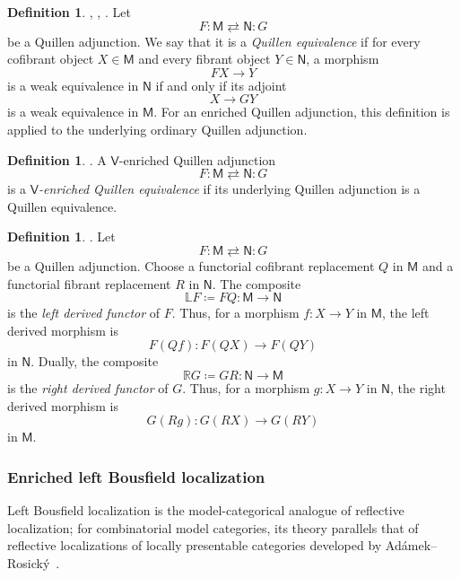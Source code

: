 \documentclass{amsart}
\newcommand{\cat}[1]{\mathsf{#1}}
\theoremstyle{definition}
\newtheorem{definition}[equation]{Definition}
\numberwithin{equation}{subsection}
\numberwithin{subsubsection}{subsection}
\begin{document}
\begin{definition}\label{def:quillen.equivalence.criterion}
  \textnormal{\cite[Chapter~I, Section~4]{Qui67}},
  \textnormal{\cite[Definition 1.3.12]{Hov99}},
  \textnormal{\cite[Definition~8.5.20]{Hir03}}.
  Let
  \[
    F:\cat{M}\rightleftarrows \cat{N}:G
  \]
  be a Quillen adjunction. We say that it is a \emph{Quillen
  equivalence} if for every cofibrant object \(X\in\cat{M}\) and every
  fibrant object \(Y\in\cat{N}\), a morphism
  \[
    FX \to Y
  \]
  is a weak equivalence in \(\cat{N}\) if and only if its adjoint
  \[
    X \to GY
  \]
  is a weak equivalence in \(\cat{M}\). For an enriched Quillen
  adjunction, this definition is applied to the underlying ordinary Quillen
  adjunction.
\end{definition}

\begin{definition}\label{def:v.quillen.equivalence}
  \textnormal{\cite[Definition~1.27.6]{Bar10}}.
  A \(\cat{V}\)-enriched Quillen adjunction
  \[
    F:\cat{M}\rightleftarrows\cat{N}:G
  \]
  is a \emph{\(\cat{V}\)-enriched Quillen equivalence} if its underlying
  Quillen adjunction is a Quillen equivalence.
\end{definition}

\begin{definition}\label{def:derived.functors}
  \textnormal{\cite[Definition~8.5.11]{Hir03}}.
  Let
  \[
    F:\cat{M}\rightleftarrows\cat{N}:G
  \]
  be a Quillen adjunction. Choose a functorial cofibrant replacement
  \(Q\) in \(\cat{M}\) and a functorial fibrant replacement \(R\) in
  \(\cat{N}\). The composite
  \[
    \mathbb{L}F\coloneqq FQ:\cat{M}\longrightarrow\cat{N}
  \]
  is the \emph{left derived functor} of \(F\). Thus, for a
  morphism \(f:X\to Y\) in \(\cat{M}\), the left derived morphism is
  \[
    F(Qf):F(QX)\longrightarrow F(QY)
  \]
  in \(\cat{N}\). Dually, the composite
  \[
    \mathbb{R}G\coloneqq GR:\cat{N}\longrightarrow\cat{M}
  \]
  is the \emph{right derived functor} of \(G\). Thus, for a
  morphism \(g:X\to Y\) in \(\cat{N}\), the right derived morphism is
  \[
    G(Rg):G(RX)\longrightarrow G(RY)
  \]
  in \(\cat{M}\).
\end{definition}

\subsubsection{Enriched left Bousfield localization}
Left Bousfield localization is the model-categorical analogue of reflective
localization; for combinatorial model categories, its theory parallels that
of reflective localizations of locally presentable categories developed by
Adámek--Rosický~\cite{AdamekRosicky94}.
\end{document}
